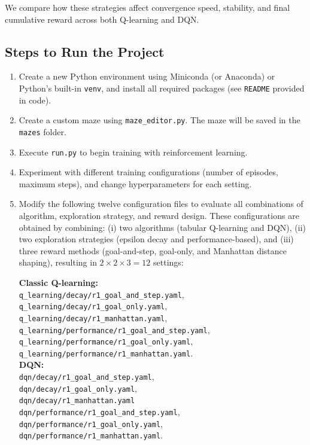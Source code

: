 \documentclass[12pt]{article}
\begin{document}
We compare how these strategies affect convergence speed, stability, 
and final cumulative reward across both Q-learning and DQN.

\subsection{Steps to Run the Project}
\begin{enumerate}
  \item Create a new Python environment using Miniconda (or Anaconda) or Python's built-in \texttt{venv}, and install all required packages (see \texttt{README} provided in code).
  \item Create a custom maze using \texttt{maze\_editor.py}. The maze will be saved in the \texttt{mazes} folder.
  \item Execute \texttt{run.py} to begin training with reinforcement learning.
  \item Experiment with different training configurations (number of episodes, maximum steps), and change hyperparameters for each setting.
  \item Modify the following twelve configuration files to evaluate all 
combinations of algorithm, exploration strategy, and reward design.
These configurations are obtained by combining:
(i) two algorithms (tabular Q-learning and DQN),
(ii) two exploration strategies (epsilon decay and performance-based),
and (iii) three reward methods (goal-and-step, goal-only, and Manhattan distance shaping),
resulting in $2 \times 2 \times 3 = 12$ settings:

    \noindent
    \textbf{Classic Q-learning:}\\
    \texttt{q\_learning/decay/r1\_goal\_and\_step.yaml},\\
    \texttt{q\_learning/decay/r1\_goal\_only.yaml},\\
    \texttt{q\_learning/decay/r1\_manhattan.yaml},\\
    \texttt{q\_learning/performance/r1\_goal\_and\_step.yaml},\\
    \texttt{q\_learning/performance/r1\_goal\_only.yaml},\\
    \texttt{q\_learning/performance/r1\_manhattan.yaml}.\\


  \noindent
    \textbf{DQN:}\\
    \texttt{dqn/decay/r1\_goal\_and\_step.yaml},\\
    \texttt{dqn/decay/r1\_goal\_only.yaml},\\
    \texttt{dqn/decay/r1\_manhattan.yaml}\\
    \texttt{dqn/performance/r1\_goal\_and\_step.yaml},\\
    \texttt{dqn/performance/r1\_goal\_only.yaml},\\
    \texttt{dqn/performance/r1\_manhattan.yaml}.\\[4pt]
    


\end{enumerate}
\end{document}

